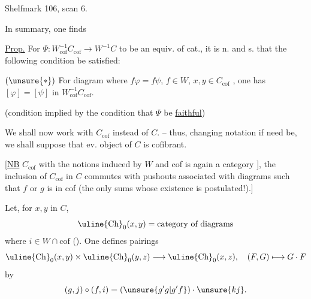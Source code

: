 Shelfmark 106, scan 6.

In summary, one finds

\uline{Prop.} For $\Psi:W_{\mathrm{cof}}^{-1}C_{\mathrm{cof}}\longrightarrow W^{-1}C$ to be an equiv. of cat., it is n. and s. that the following condition be satisfied:

$(\unsure{*})$ For  diagram
where $f\varphi=f\psi$, $f\in W$, $x,y\in C_{\mathrm{cof}}$ , one has $[\varphi]=[\psi]$ in $W_{\mathrm{cof}}^{-1}C_{\mathrm{cof}}$.

(condition implied by the condition that $\Psi$ be \uline{faithful})

We shall now work with $C_{\mathrm{cof}}$ instead of $C$. -- thus, changing notation if need be, we shall suppose that ev. object of $C$ is cofibrant.

[\uline{NB} $C_{\mathrm{cof}}$ with the notions induced by $W$ and cof is again a category ], the inclusion of $C_{\mathrm{cof}}$ in $C$ commutes with pushouts  associated with diagrams
such that $f$ or $g$ is in cof (the only sums whose existence is postulated!).]

Let, for $x,y$ in $C$,
\[
\uline{\mathrm{Ch}}_0(x,y)=\text{category of diagrams}
\]
where $i\in W\cap\mathrm{cof}$  (). One defines pairings
\[
\uline{\mathrm{Ch}}_0(x,y)\times\uline{\mathrm{Ch}}_0(y,z)\longrightarrow\uline{\mathrm{Ch}}_0(x,z),\quad (F,G)\longmapsto G\mathbin{\cdot}F
\]
by
\[
(g,j)\mathbin{\circ}(f,i)=(\unsure{g'g|g'f})\mathbin{\cdot}\unsure{kj}.
\]
